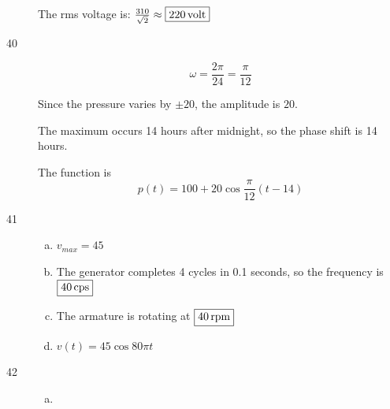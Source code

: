 \documentclass{exam}
\begin{document}
\begin{description}
        The rms voltage is: $\frac{310}{\sqrt{2}} \approx \boxed{ \unit[ 220 ]{ volt } }$ 

      \item[40]
        \[
          \omega = \frac{2 \pi}{24} = \frac{\pi}{12}
        \]

        Since the pressure varies by $\pm 20$, the amplitude is $20$.

        The maximum occurs 14 hours after midnight, so the phase shift is 14 hours.

        The function is
        \[
          \boxed{ p(t) = 100 + 20 \cos \frac{\pi}{12} (t - 14) }
        \]

      \item[41]
        \begin{enumerate}[(a)]
          \item $\boxed{ v_{max} = 45 }$

          \item The generator completes 4 cycles in 0.1 seconds, so the frequency is $\boxed{ \unit[ 40 ]{cps} }$

          \item The armature is rotating at $\boxed{ \unit[ 40 ]{rpm} }$

          \item $\boxed{ v(t) = 45 \cos 80 \pi t }$

        \end{enumerate}

      \pagebreak

      \item[42]
        \begin{enumerate}[(a)]
          \item 
\end{enumerate}
\end{description}
\end{document}
